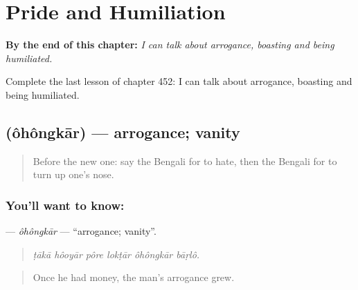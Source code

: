 
\chapter{Pride and Humiliation}
\label{ch:bn-pride-and-humiliation}

\begin{chapteropening}
\textbf{By the end of this chapter:} \emph{I can talk about arrogance, boasting and being humiliated.}

Complete the last lesson of chapter 452: I can talk about arrogance, boasting and being humiliated.
\end{chapteropening}

\section[\texorpdfstring{\bn{অহংকার} (ôhôngkār)}{অহংকার (ôhôngkār)}]{ (ôhôngkār) — arrogance; vanity}

\label{lesson:BN-C452-ohongkar}



\begin{quote}
Before the new one: say the Bengali for to hate, then the Bengali for to turn up one's nose.
\end{quote}

\subsection*{You'll want to know: }
\textbf{} — \emph{ôhôngkār} — \textquotedblleft{}arrogance; vanity\textquotedblright{}.

\begin{quote}
     
\end{quote}

\begin{quote}
\emph{ṭākā hôoyār pôre lokṭār ôhôngkār bāṛlô.}
\end{quote}

\begin{quote}
Once he had money, the man's arrogance grew.
\end{quote}

